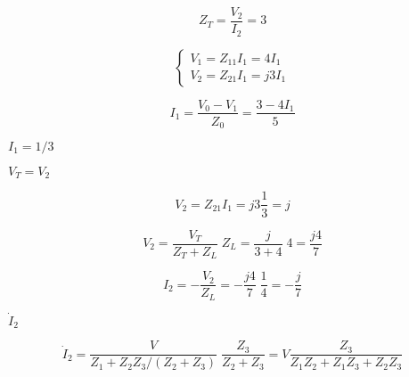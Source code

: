 {\newpage\clearpage
{}%
\begin{displaymath} Z_T=\frac{V_2}{I_2}=3	\end{displaymath}%
\lthtmldisplayZ
\lthtmlcheckvsize\clearpage}

{\newpage\clearpage
{}%
\begin{displaymath} \left\{ \begin{array}{l} V_1=Z_{11}I_1=4I_1 \\
      V_2=Z_{21}I_1=j3 I_1 \end{array} \right. \end{displaymath}%
\lthtmldisplayZ
\lthtmlcheckvsize\clearpage}

{\newpage\clearpage
{}%
\begin{displaymath}	I_1=\frac{V_0-V_1}{Z_0}=\frac{3-4I_1}{5}	\end{displaymath}%
\lthtmldisplayZ
\lthtmlcheckvsize\clearpage}

{\newpage\clearpage
{}%
$I_1=1/3$%
\lthtmlinlinemathZ
\lthtmlcheckvsize\clearpage}

{\newpage\clearpage
{}%
$V_T=V_2$%
\lthtmlinlinemathZ
\lthtmlcheckvsize\clearpage}

{\newpage\clearpage
{}%
\begin{displaymath}	V_2=Z_{21}I_1=j3 \frac{1}{3}=j	\end{displaymath}%
\lthtmldisplayZ
\lthtmlcheckvsize\clearpage}

{\newpage\clearpage
{}%
\begin{displaymath} V_2=\frac{V_T}{Z_T+Z_L}\;Z_L=\frac{j}{3+4}\;4=\frac{j4}{7} \end{displaymath}%
\lthtmldisplayZ
\lthtmlcheckvsize\clearpage}

{\newpage\clearpage
{}%
\begin{displaymath} I_2=-\frac{V_2}{Z_L}=-\frac{j4}{7}\;\frac{1}{4}=-\frac{j}{7} \end{displaymath}%
\lthtmldisplayZ
\lthtmlcheckvsize\clearpage}

{\newpage\clearpage
{}%
$\dot{I}_2$%
\lthtmlinlinemathZ
\lthtmlcheckvsize\clearpage}

{\newpage\clearpage
{}%
\begin{displaymath} \dot{I}_2=\frac{V}{Z_1+Z_2 Z_3/(Z_2+Z_3)}\;\frac{Z_3}{Z_2+Z_3}
=V \frac{Z_3}{Z_1Z_2+Z_1Z_3+Z_2Z_3} \end{displaymath}%
\lthtmldisplayZ
\lthtmlcheckvsize\clearpage}

